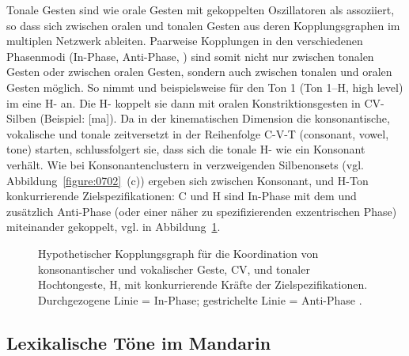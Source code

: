 \largerpage
Tonale Gesten sind wie orale Gesten mit gekoppelten Oszillatoren als  assoziiert, so dass sich  zwischen oralen und tonalen Gesten aus deren Kopplungsgraphen im multiplen Netzwerk ableiten. Paarweise Kopplungen in den verschiedenen Phasenmodi (In-Phase, Anti-Phase, ) sind somit nicht nur zwischen tonalen Gesten oder zwischen oralen Gesten, sondern auch zwischen tonalen und oralen Gesten möglich. So nimmt \citet{Gao2006} und \citet{Gao2009} beispielsweise für den Ton 1 (Ton 1–H, high level) im  eine H- an. Die H- koppelt sie dann mit oralen Konstriktionsgesten in CV-Silben (Beispiel: [ma]). Da in der kinematischen Dimension die konsonantische, vokalische und tonale  zeitversetzt in der Reihenfolge C-V-T (consonant, vowel, tone) starten, schlussfolgert sie, dass sich die tonale H- wie ein Konsonant verhält. Wie bei Konsonantenclustern in verzweigenden Silbenonsets (vgl. Abbildung~\ref{figure:0702}~(c)) ergeben sich zwischen Konsonant,  und H-Ton konkurrierende Zielspezifikationen: C und H sind In-Phase mit dem  und zusätzlich Anti-Phase (oder einer näher zu spezifizierenden exzentrischen Phase) miteinander gekoppelt, vgl.  in Abbildung~\ref{figure:0704}.

\begin{figure}[hbtp]

	\caption{Hypothetischer Kopplungsgraph für die Koordination von konsonantischer und vokalischer Geste, CV, und tonaler Hochtongeste, H, mit konkurrierende Kräfte der Zielspezifikationen. Durchgezogene Linie = In-Phase; gestrichelte Linie = Anti-Phase \citep[adaptiert von][]{Gao2009}.}
	\label{figure:0704}
\end{figure}

\subsection{Lexikalische Töne im Mandarin}
\label{subsec:070102}

